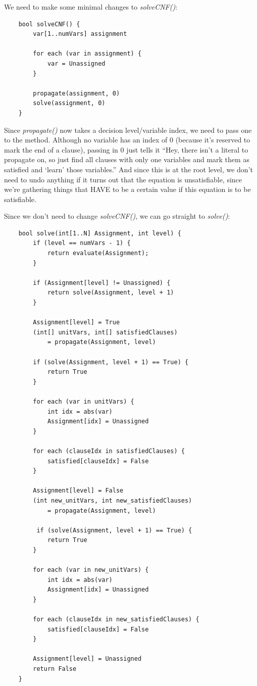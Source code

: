 \documentclass[oneside]{book}
\begin{document}
We need to make some minimal changes to \textit{solveCNF()}:

\begin{lstlisting}
    bool solveCNF() {
        var[1..numVars] assignment

        for each (var in assignment) {
            var = Unassigned
        }

        propagate(assignment, 0)
        solve(assignment, 0)
    }
\end{lstlisting}

Since \textit{propagate()} now takes a decision level/variable index, we need to pass 
one to the method. Although no variable has an index of 0 (because it's reserved to mark the 
end of a clause), passing in $0$ just tells it ``Hey, there isn't a literal to propagate on,
so just find all clauses with only one variables and mark them as satisfied and `learn' those 
variables.'' And since this is at the root level, we don't need to undo anything if it turns out 
that the equation is unsatisfiable, since we're gathering things that HAVE to be a certain value 
if this equation is to be satisfiable.

Since we don't need to change \textit{solveCNF()}, we can go straight to \textit{solve()}:

\begin{lstlisting}
    bool solve(int[1..N] Assignment, int level) {
        if (level == numVars - 1) {
            return evaluate(Assignment);
        }

        if (Assignment[level] != Unassigned) {
            return solve(Assignment, level + 1)
        }

        Assignment[level] = True
        (int[] unitVars, int[] satisfiedClauses) 
            = propagate(Assignment, level)

        if (solve(Assignment, level + 1) == True) {
            return True
        }

        for each (var in unitVars) {
            int idx = abs(var)
            Assignment[idx] = Unassigned
        }

        for each (clauseIdx in satisfiedClauses) {
            satisfied[clauseIdx] = False
        }

        Assignment[level] = False
        (int new_unitVars, int new_satisfiedClauses) 
            = propagate(Assignment, level)

         if (solve(Assignment, level + 1) == True) {
            return True
        }

        for each (var in new_unitVars) {
            int idx = abs(var)
            Assignment[idx] = Unassigned
        }

        for each (clauseIdx in new_satisfiedClauses) {
            satisfied[clauseIdx] = False
        }

        Assignment[level] = Unassigned
        return False
    }
\end{lstlisting}
\end{document}
